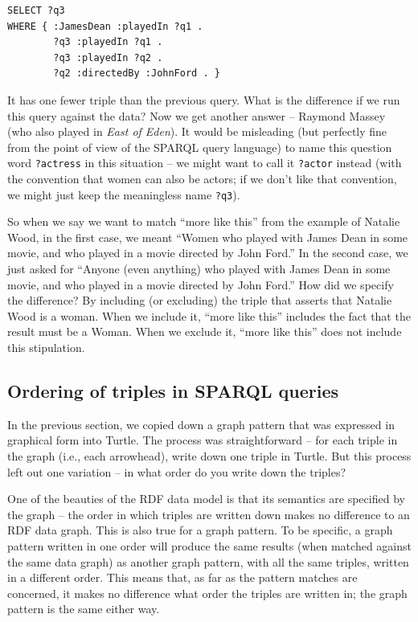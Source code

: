 \begin{lstlisting}
SELECT ?q3
WHERE { :JamesDean :playedIn ?q1 .
        ?q3 :playedIn ?q1 .
        ?q3 :playedIn ?q2 .
        ?q2 :directedBy :JohnFord . }
\end{lstlisting}

It has one fewer triple than the previous query. What is the difference
if we run this query against the data? Now we get another answer --
Raymond Massey (who also played in \emph{East of Eden}). It would be
misleading (but perfectly fine from the point of view of the SPARQL
query language) to name this question word \texttt{?actress} in this situation --
we might want to call it \texttt{?actor} instead (with the convention that women
can also be actors; if we don't like that convention, we might just keep
the meaningless name \texttt{?q3}).

So when we say we want to match ``more like this'' from the example of
Natalie Wood, in the first case, we meant ``Women who played with James
Dean in some movie, and who played in a movie directed by John Ford.''
In the second case, we just asked for ``Anyone (even anything) who
played with James Dean in some movie, and who played in a movie directed
by John Ford.'' How did we specify the difference? By including (or
excluding) the triple that asserts that Natalie Wood is a woman. When we
include it, ``more like this'' includes the fact that the result must be
a Woman. When we exclude it, ``more like this'' does not include this
stipulation.

\subsection{Ordering of triples in SPARQL queries}

In the previous section, we copied down a graph pattern that was
expressed in graphical form into Turtle. The process was straightforward
-- for each triple in the graph (i.e., each arrowhead), write down one
triple in Turtle. But this process left out one variation -- in what
order do you write down the triples?

One of the beauties of the RDF data model is that its semantics are
specified by the graph -- the order in which triples are written down
makes no difference to an RDF data graph. This is
also true for a graph pattern. To be specific, a graph pattern written
in one order will produce the same results (when matched against the
same data graph) as another graph pattern, with all the same triples,
written in a different order. This means that, as far as the pattern
matches are concerned, it makes no difference what order the triples are
written in; the graph pattern is the same either way.

